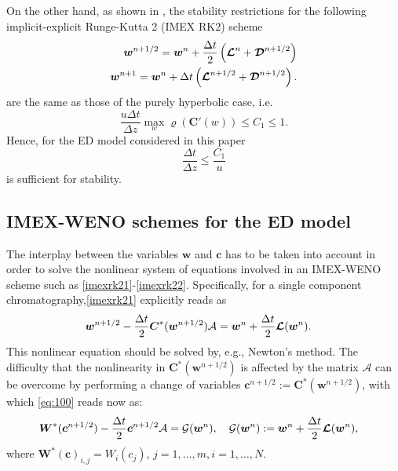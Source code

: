 \documentclass[preprint]{elsarticle}
\theoremstyle{definition}
\newcommand{\bw}{\boldsymbol w}
\newcommand{\bc}{\boldsymbol c}
\newcommand{\bC}{\boldsymbol C}
\def\boc#1{\boldsymbol{{\cal #1}}}
\def\mD{\boc{D}}
\begin{document}
On the other hand, as shown in \cite{Donat1}, the stability
restrictions for 
 the following implicit-explicit Runge-Kutta 2 
(IMEX RK2) scheme
\begin{eqnarray}\label{imexrk21}
\boldsymbol{w}^{n+1/2}=\boldsymbol{w}^n+\frac{\Delta t}{2}
\left(\boldsymbol{{\cal L}}^n+\boldsymbol{{\mD}}^{n+1/2} \right) \\
\boldsymbol{w}^{n+1}=\boldsymbol{{w}}^n+\Delta t
\left(\boldsymbol{{\cal L}}^{n+1/2}+\boldsymbol{{\mD}}^{n+1/2}
\right). \label{imexrk22}
\end{eqnarray}
are the same as those of the purely hyperbolic case, i.e.
\begin{equation*}
\frac{u\Delta t}{\Delta z}\max_w \varrho (\bC'(w))\le C_1 \le 1.
\end{equation*}
Hence, for the ED model considered in this paper
\begin{equation}\label{IMEXstability}
\frac{\Delta t}{\Delta z}\le \frac{C_1}{u} 
\end{equation}
is sufficient for stability.

\subsection{IMEX-WENO schemes for the ED model}

The interplay between the variables $\bw$ and $\bc$ has to be taken
into account in order to solve the nonlinear system of equations
involved in an IMEX-WENO scheme such as
\eqref{imexrk21}-\eqref{imexrk22}. 
Specifically, for a single component chromatography,\eqref{imexrk21} explicitly reads as 
\begin{align}\label{eq:100}
\bw^{n+1/2}-\frac{\Delta t}{2}
\boldsymbol{C}^*(\bw^{n+1/2})\mathcal{A}
&=\bw^n+\frac{\Delta t}{2}
\boldsymbol{{\cal L}}(\bw^n).
\end{align}
This nonlinear equation should be solved by, e.g.,  Newton's
method. The difficulty that the nonlinearity in 
$\boldsymbol{C}^*(\bw^{n+1/2})$ is affected by the matrix
$\mathcal{A}$ can be overcome by performing a change of variables 
$\bc^{n+1/2}:=\boldsymbol{C}^*(\bw^{n+1/2})$, with which
\eqref{eq:100} reads now as:
\begin{align}\label{eq:100a}
\boldsymbol{W}^*(\bc^{n+1/2})-\frac{\Delta t}{2}
\bc^{n+1/2}\mathcal{A}
&=\mathcal{G}(\bw^n),\quad
\mathcal{G}(\bw^n):=
\bw^n+\frac{\Delta t}{2}
\boldsymbol{{\cal L}}(\bw^n),
\end{align}
where $\boldsymbol{W}^*(\bc)_{i,j}= W_i(c_j)$, $j=1,\dots,m, i=1,\dots,N$.
\end{document}
